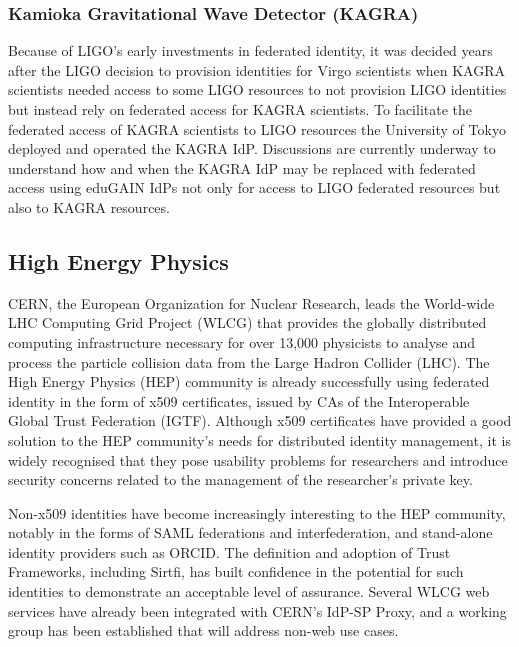 \documentclass[fleqn,10pt]{wlscirep}
\begin{document}
{\subsubsection{Kamioka Gravitational Wave Detector (KAGRA)}
Because of LIGO's early investments in federated identity, it was decided years after the LIGO decision to provision identities for Virgo scientists when KAGRA scientists needed access to some LIGO resources to not provision LIGO identities but instead rely on federated access for KAGRA scientists. To facilitate the federated access of KAGRA scientists to LIGO resources the University of Tokyo deployed and operated the KAGRA IdP. Discussions are currently underway to understand how and when the KAGRA IdP may be replaced with federated access using eduGAIN IdPs not only for access to LIGO federated resources but also to KAGRA resources.

\subsection{High Energy Physics}
CERN, the European Organization for Nuclear Research, leads the World-wide LHC Computing Grid Project (WLCG) that provides the globally distributed computing infrastructure necessary for over 13,000 physicists to analyse and process the particle collision data from the Large Hadron Collider (LHC). The High Energy Physics (HEP) community is already successfully using federated identity in the form of x509 certificates, issued by CAs of the Interoperable Global Trust Federation (IGTF). Although x509 certificates have provided a good solution to the HEP community’s needs for distributed identity management, it is widely recognised that they pose usability problems for researchers and introduce security concerns related to the management of the researcher’s private key.

Non-x509 identities have become increasingly interesting to the HEP community, notably in the forms of SAML federations and interfederation, and stand-alone identity providers such as ORCID. The definition and adoption of Trust Frameworks, including Sirtfi, has built confidence in the potential for such identities to demonstrate an acceptable level of assurance. Several WLCG web services have already been integrated with CERN’s IdP-SP Proxy, and a working group has been established that will address non-web use cases.

}
\end{document}
